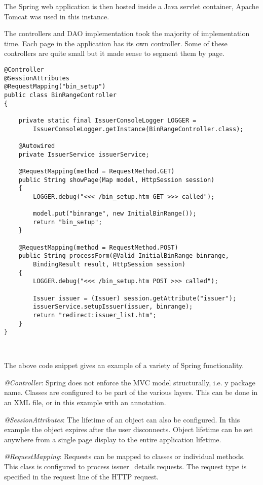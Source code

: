 \documentclass[a4paper, 11pt, titlepage]{article}
\begin{document}
The Spring web application is then hosted inside a Java servlet container, Apache Tomcat was used in this instance. 
 
The controllers and DAO implementation took the majority of implementation time. Each page in the application has its own controller. Some of these controllers are quite small but it made sense to segment them by page.  
 
\begin{verbatim} 
@Controller 
@SessionAttributes 
@RequestMapping("bin_setup") 
public class BinRangeController 
{ 
 
    private static final IssuerConsoleLogger LOGGER = 
        IssuerConsoleLogger.getInstance(BinRangeController.class); 
 
    @Autowired 
    private IssuerService issuerService; 
 
    @RequestMapping(method = RequestMethod.GET) 
    public String showPage(Map model, HttpSession session) 
    { 
        LOGGER.debug("<<< /bin_setup.htm GET >>> called"); 
 
        model.put("binrange", new InitialBinRange()); 
        return "bin_setup"; 
    } 
 
    @RequestMapping(method = RequestMethod.POST) 
    public String processForm(@Valid InitialBinRange binrange, 
        BindingResult result, HttpSession session) 
    { 
        LOGGER.debug("<<< /bin_setup.htm POST >>> called"); 
 
        Issuer issuer = (Issuer) session.getAttribute("issuer"); 
        issuerService.setupIssuer(issuer, binrange); 
        return "redirect:issuer_list.htm"; 
    } 
} 
 
 
\end{verbatim} 
 
The above code snippet gives an example of a variety of Spring functionality.  
 
\textit{@Controller}: Spring does not enforce the MVC model structurally, i.e. y package name. Classes are configured to be part of the various layers. This can be done in an XML file, or in this example with an annotation.  
 
\textit{@SessionAttributes}: The lifetime of an object can also be configured. In this example the object expires after the user disconnects. Object lifetime can be set anywhere from a single page display to the entire application lifetime. 
 
\textit{@RequestMapping}: Requests can be mapped to classes or individual methods. This class is configured to process issuer\_details requests. The request type is specified in the request line of the HTTP request. 
 
\end{document}
